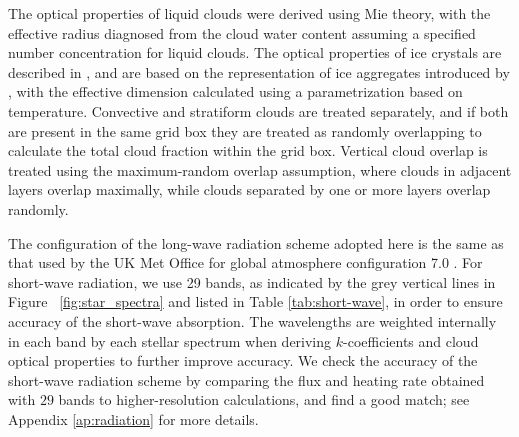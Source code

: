 \documentclass[11pt,numberedappendix,twocolappendix,]{emulateapj}
\begin{document}
The optical properties of liquid clouds were derived using Mie theory, with the effective radius diagnosed from the cloud water content assuming a specified number concentration for liquid clouds. 
The optical properties of ice crystals are described in \citet{Edwards2007}, and are based on the representation of ice aggregates introduced by \citet{Baran2001}, with the effective dimension calculated using a parametrization based on temperature. 
Convective and stratiform clouds are treated separately, and if both are present in the same grid box they are treated as randomly overlapping to calculate the total cloud fraction within the grid box. 
Vertical cloud overlap is treated using the maximum-random overlap assumption, where clouds in adjacent layers overlap maximally, while clouds separated by one or more layers overlap randomly. 

The configuration of the long-wave radiation scheme adopted here is the same as that used by the UK Met Office for global atmosphere configuration 7.0 \citep[GA7.0;][]{Walters2017}. 
For short-wave radiation, we use 29 bands, as indicated by the grey vertical lines in Figure ~\ref{fig:star_spectra} and listed in Table \ref{tab:short-wave}, in order to ensure accuracy of the short-wave absorption. 
The wavelengths are weighted internally in each band by each stellar spectrum when deriving $k$-coefficients and cloud optical properties to further improve accuracy. 
We check the accuracy of the short-wave radiation scheme by comparing the flux and heating rate obtained with $29$ bands to higher-resolution calculations, and find a good match; see Appendix \ref{ap:radiation} for more details. 
\end{document}
